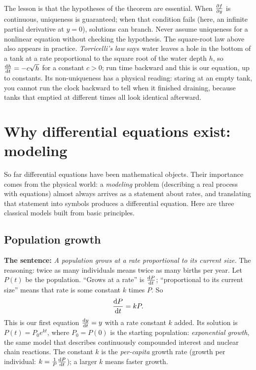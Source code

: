\begin{trapbox}
The lesson is that the hypotheses of the theorem are essential.
When $\frac{\partial f}{\partial y}$ is continuous, uniqueness is guaranteed; when that condition fails (here, an infinite partial derivative at $y=0$), solutions can branch. Never assume uniqueness for a nonlinear equation without checking the hypothesis. The square-root law above also appears in practice. \emph{Torricelli's law} says water leaves a hole in the bottom of a tank at a rate proportional to the square root of the water depth $h$, so $\frac{\mathrm{d} h}{\mathrm{d} t} = -c\sqrt{h}$ for a constant $c>0$; run time backward and this is our equation, up to constants. Its non-uniqueness has a physical reading: staring at an empty tank, you cannot run the clock backward to tell when it finished draining, because tanks that emptied at different times all look identical afterward.
\end{trapbox}

\section{Why differential equations exist: modeling}
\label{ch36:sec-model}

So far differential equations have been mathematical objects. Their importance comes from the physical world: a \emph{modeling} problem (describing a real process with equations) almost always arrives as a statement about rates, and translating that statement into symbols produces a differential equation. Here are three classical models built from basic principles.

\subsection{Population growth}

\begin{applicationbox}
\textbf{The sentence:} \emph{A population grows at a rate proportional to its current size.} The reasoning: twice as many individuals means twice as many births per year. Let $P(t)$ be the population. ``Grows at a rate'' is $\frac{\mathrm{d} P}{\mathrm{d} t}$; ``proportional to its current size'' means that rate is some constant $k$ times $P$. So
\[
  \frac{\mathrm{d} P}{\mathrm{d} t} = kP.
\]
This is our first equation $\frac{\mathrm{d} y}{\mathrm{d} t}=y$ with a rate constant $k$ added. Its solution is $P(t) = P_0 e^{kt}$, where $P_0 = P(0)$ is the starting population: \emph{exponential growth}, the same model that describes continuously compounded interest and nuclear chain reactions. The constant $k$ is the \emph{per-capita} growth rate (growth per individual: $k = \frac{1}{P}\frac{\mathrm{d} P}{\mathrm{d} t}$); a larger $k$ means faster growth.
\end{applicationbox}

